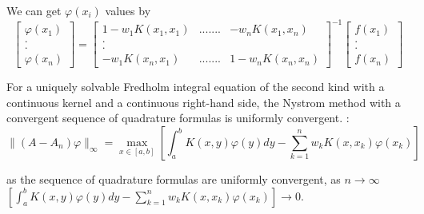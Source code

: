\documentclass[../document.tex]{subfiles}
\begin{document}
	We can get $\varphi(x_i)$ values  by 
	$$
	\begin{bmatrix}
		\varphi(x_1) \\
		.\\.\\
		\varphi(x_n) 
	\end{bmatrix}
	=
	\begin{bmatrix}
		1 -w_1 K(x_1,x_1) &   ....... & -w_n K(x_1,x_n) \\
		.\\.\\
		-w_1 K(x_n,x_1)   &   ....... & 1-w_n K(x_n,x_n) 
	\end{bmatrix}^{-1}
	\begin{bmatrix}
		f(x_1) \\
		.\\.\\
		f(x_n)
	\end{bmatrix}
	$$
	\begin{theorem}
		For a uniquely solvable Fredholm integral equation of the second kind with a continuous kernel and a continuous right-hand side, the Nystrom method with a convergent sequence of quadrature formulas is uniformly convergent. \newline
		\proofname:
		$$\|(A - A_n)\varphi\|_{\infty} =
		\max_{x \in [a,b]}
		\left[
		\int_a^b K(x,y)\varphi(y)dy - \sum_{k=1}^{n} w_k K(x,x_k)\varphi(x_k)
		\right]
		$$
		
		as the sequence of quadrature formulas are uniformly convergent, as $n \rightarrow \infty$
		$ 
		\left[
		\int_a^b K(x,y)\varphi(y)dy - \sum_{k=1}^{n} w_k K(x,x_k)\varphi(x_k)
		\right] \rightarrow 0 .
		$
	\end{theorem}
	
\end{document}
